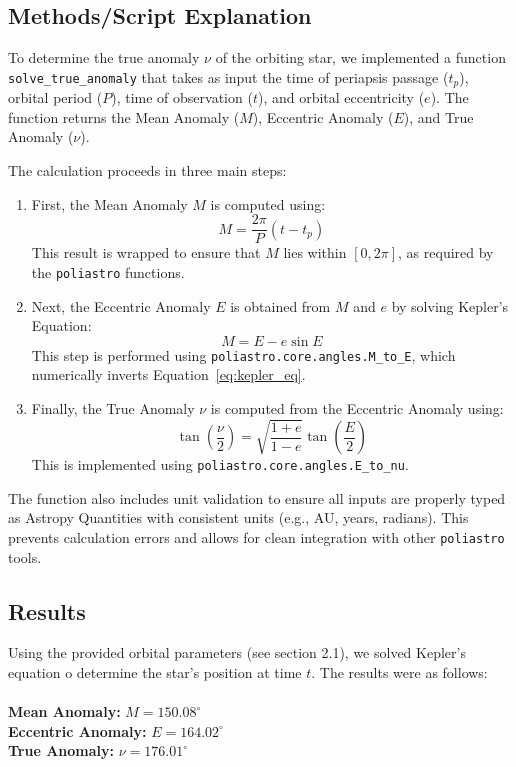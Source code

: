 \documentclass[linenumbers,trackchanges,astrosymb,]{aastex7}
\begin{document}
\subsection{Methods/Script Explanation}

To determine the true anomaly $\nu$ of the orbiting star, we implemented a function \texttt{solve\_true\_anomaly} that takes as input the time of periapsis passage ($t_p$), orbital period ($P$), time of observation ($t$), and orbital eccentricity ($e$). The function returns the Mean Anomaly ($M$), Eccentric Anomaly ($E$), and True Anomaly ($\nu$).

The calculation proceeds in three main steps:
\begin{enumerate}
  \item First, the Mean Anomaly $M$ is computed using:
  \begin{equation}
  M = \frac{2\pi}{P}(t - t_p)
  \label{eq:mean_anomaly}
  \end{equation}
  This result is wrapped to ensure that $M$ lies within $[0, 2\pi]$, as required by the \texttt{poliastro} functions.

  \item Next, the Eccentric Anomaly $E$ is obtained from $M$ and $e$ by solving Kepler’s Equation:
  \begin{equation}
  M = E - e\sin E
  \label{eq:kepler_eq}
  \end{equation}
  This step is performed using \texttt{poliastro.core.angles.M\_to\_E}, which numerically inverts Equation~\ref{eq:kepler_eq}.

  \item Finally, the True Anomaly $\nu$ is computed from the Eccentric Anomaly using:
  \begin{equation}
  \tan\left(\frac{\nu}{2}\right) = \sqrt{\frac{1+e}{1-e}} \tan\left(\frac{E}{2}\right)
  \label{eq:true_anomaly}
  \end{equation}
  This is implemented using \texttt{poliastro.core.angles.E\_to\_nu}.
\end{enumerate}

The function also includes unit validation to ensure all inputs are properly typed as Astropy Quantities with consistent units (e.g., AU, years, radians). This prevents calculation errors and allows for clean integration with other \texttt{poliastro} tools.

\subsection{Results}
Using the provided orbital parameters (see section 2.1), we solved Kepler's equation o determine the star's position at time $t$. The results were as follows: \\
\\
    \textbf{Mean Anomaly:} $M =150.08^\circ$ \\
    \textbf{Eccentric Anomaly:} $E = 164.02^\circ$ \\
    \textbf{True Anomaly:} $\nu = 176.01^\circ$ \\
\end{document}

